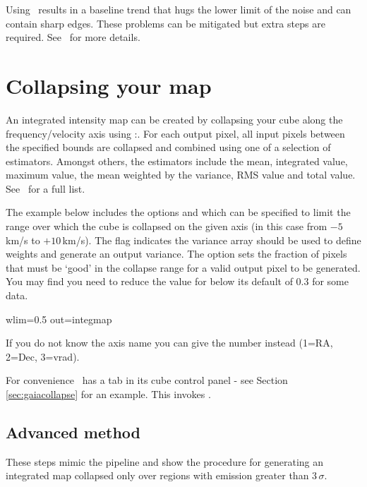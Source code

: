 \documentclass[11pt,oneside,chapters]{starlink}
\begin{document}
Using \findback\ results in a baseline trend that hugs the lower limit
of the noise and can contain sharp edges. These problems can be
mitigated but extra steps are required. See \cupidsun\ for more
details.

\section{Collapsing your map}

An integrated intensity map can be created by collapsing your cube
along the frequency/velocity axis using \Kappa:\collapse. For each
output pixel, all input pixels between the specified bounds are
collapsed and combined using one of a selection of estimators. Amongst
others, the estimators include the mean, integrated value, maximum
value, the mean weighted by the variance, RMS value and total value.
See \kappasun\ for a full list.

The example below includes the options  and 
which can be specified to limit the range over which the cube is
collapsed on the given axis (in this case from $-5$\,km/s to $+10$\,km/s).
The  flag indicates the variance array should be used
to define weights and generate an output variance. The option
 sets the fraction of pixels that must be `good' in the
collapse range for a valid output pixel to be generated. You may find
you need to reduce the value for  below its default of 0.3
for some data.

\begin{terminalv}
  wlim=0.5 out=integmap
\end{terminalv}
If you do not know the axis name you can give the number instead
(1=RA, 2=Dec, 3=vrad).

For convenience \gaia\ has a  tab in its cube
control panel - see Section \ref{sec:gaiacollapse} for an example.  
This invokes \collapse.


\subsection{Advanced method}

These steps mimic the pipeline and show the procedure for generating
an integrated map collapsed only over regions with emission greater
than 3\,$\sigma$.
\end{document}
